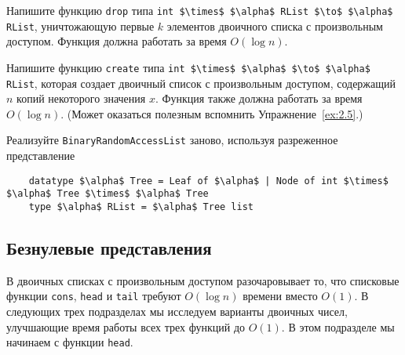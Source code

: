 \ifanswers
\begin{frame}[fragile]{}
\begin{exercise}\label{ex:9.1}
  Напишите функцию \lstinline!drop! типа
  \lstinline!int $\times$ $\alpha$ RList $\to$ $\alpha$ RList!, уничтожающую первые $k$
  элементов двоичного списка с произвольным доступом. Функция должна
  работать за время $O(\log n)$.
\end{exercise}

\begin{exercise}\label{ex:9.2}
  Напишите функцию \lstinline!create! типа
  \lstinline!int $\times$ $\alpha$ $\to$ $\alpha$ RList!, которая создает
  двоичный список с произвольным доступом, содержащий $n$ копий
  некоторого значения $x$. Функция также должна работать за время
  $O(\log n)$. (Может оказаться полезным вспомнить Упражнение~\ref{ex:2.5}.)
\end{exercise}

\begin{exercise}\label{ex:9.3}
  Реализуйте \lstinline!BinaryRandomAccessList! заново, используя
  разреженное представление
  \begin{lstlisting}
    datatype $\alpha$ Tree = Leaf of $\alpha$ | Node of int $\times$ $\alpha$ Tree $\times$ $\alpha$ Tree
    type $\alpha$ RList = $\alpha$ Tree list
  \end{lstlisting}
\end{exercise}
\end{frame}
\fi 

\subsection{Безнулевые представления}
\label{sc:9.2.2}

\begin{frame}[fragile]{}

В двоичных списках с произвольным доступом разочаровывает то, что
списковые функции \lstinline!cons!, \lstinline!head! и
\lstinline!tail! требуют $O(\log n)$ времени вместо $O(1)$. В
следующих трех подразделах мы исследуем варианты двоичных чисел,
улучшающие время работы всех трех функций до $O(1)$. В этом подразделе
мы начинаем с функции \lstinline!head!.

\end{frame}

